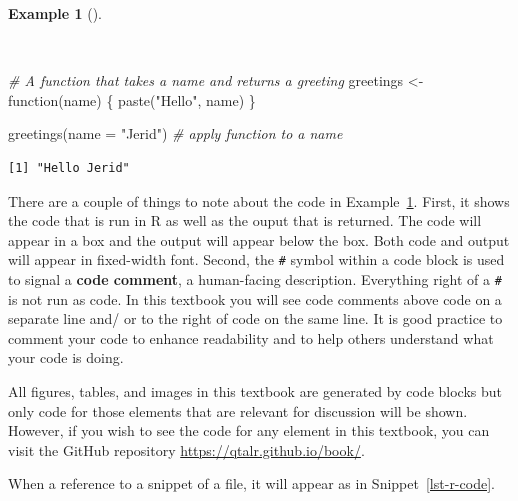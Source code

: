 \documentclass[
  letterpaper,
]{latex/krantz}
\newenvironment{Shaded}{\begin{snugshade}}{\end{snugshade}}
\newcommand{\AttributeTok}[1]{\textcolor[rgb]{0.00,0.00,0.00}{#1}}
\newcommand{\CommentTok}[1]{\textcolor[rgb]{0.00,0.00,0.00}{\textit{#1}}}
\newcommand{\ControlFlowTok}[1]{\textcolor[rgb]{0.00,0.00,0.00}{#1}}
\newcommand{\DecValTok}[1]{\textcolor[rgb]{0.00,0.00,0.00}{#1}}
\newcommand{\FunctionTok}[1]{\textcolor[rgb]{0.00,0.00,0.00}{#1}}
\newcommand{\NormalTok}[1]{\textcolor[rgb]{0.00,0.00,0.00}{#1}}
\newcommand{\OtherTok}[1]{\textcolor[rgb]{0.00,0.00,0.00}{#1}}
\newcommand{\SpecialCharTok}[1]{\textcolor[rgb]{0.00,0.00,0.00}{#1}}
\newcommand{\StringTok}[1]{\textcolor[rgb]{0.00,0.00,0.00}{#1}}
\theoremstyle{definition}
\newtheorem{example}{Example}[chapter]
\theoremstyle{remark}
\begin{document}
\begin{example}[]\protect\hypertarget{exm-code-block}{}\label{exm-code-block}

~

\begin{Shaded}
\begin{Highlighting}[]
\CommentTok{\# A function that takes a name and returns a greeting}
\NormalTok{greetings }\OtherTok{\textless{}{-}} \ControlFlowTok{function}\NormalTok{(name) \{}
  \FunctionTok{paste}\NormalTok{(}\StringTok{"Hello"}\NormalTok{, name)}
\NormalTok{\}}

\FunctionTok{greetings}\NormalTok{(}\AttributeTok{name =} \StringTok{"Jerid"}\NormalTok{) }\CommentTok{\# apply function to a name}
\end{Highlighting}
\end{Shaded}

\begin{verbatim}
[1] "Hello Jerid"
\end{verbatim}

\end{example}

There are a couple of things to note about the code in
Example~\ref{exm-code-block}. First, it shows the code that is run in R
as well as the ouput that is returned. The code will appear in a box and
the output will appear below the box. Both code and output will appear
in fixed-width font. Second, the \texttt{\#} symbol within a code block
is used to signal a \textbf{code comment}, a human-facing description.
Everything right of a \texttt{\#} is not run as code. In this textbook
you will see code comments above code on a separate line and/ or to the
right of code on the same line. It is good practice to comment your code
to enhance readability and to help others understand what your code is
doing.

All figures, tables, and images in this textbook are generated by code
blocks but only code for those elements that are relevant for discussion
will be shown. However, if you wish to see the code for any element in
this textbook, you can visit the GitHub repository
\url{https://qtalr.github.io/book/}.

When a reference to a snippet of a file, it will appear as in
Snippet~\ref{lst-r-code}.

\begin{codelisting}

\caption{\label{lst-r-code}\emph{example.R} file}

\centering{

\begin{Shaded}
\begin{Highlighting}[]
\CommentTok{\# Load package}
\FunctionTok{library}\NormalTok{(tidyverse)}

\CommentTok{\# Add 1 and 1}
\DecValTok{1} \SpecialCharTok{+} \DecValTok{1}
\end{Highlighting}
\end{Shaded}

}

\end{codelisting}%
\end{document}

